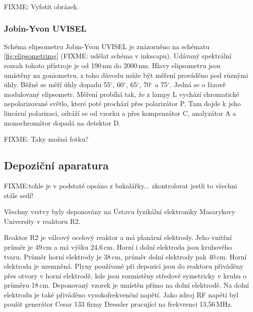 FIXME: Vyfotit obrázek.


\subsubsection{Jobin-Yvon UVISEL}
Schéma elipsometru Jobin-Yvon UVISEL je znázorněno na schématu \ref{fig:elipsometrimg} (FIXME: udělat schéma v inkscapu). Udávaný spektrální rozsah tohoto přístroje je od 190\,nm do 2000\,nm. Hlavy elipsometru jsou umístěny na goniometru, z toho důvodu může být měření prováděno pod různými úhly. Běžně se měří úhly dopadu 55$^\circ$, 60$^\circ$, 65$^\circ$, 70$^\circ$ a 75$^\circ$. Jedná se o fázově modulovaný elipsometr. Měření probíhá tak, že z lampy L vychází chromatické nepolarizované světlo, které poté prochází přes polarizátor P. Tam dojde k jeho lineární polarizaci, odráží se od vzorku a přes kompenzátor C, analyzátor A a monochromátor dopadá na detektor D.

FIXME: Taky možná fotku?


\subsection{Depoziční aparatura}
FIXME:tohle je v podstatě opsáno z bakalářky... zkontrolovat jestli to všechni stále sedí!

Všechny vrstvy byly deponovány na Ústavu fyzikální elektroniky Masarykovy University v reaktoru R2. 

Reaktor R2 je válcový ocelový reaktor a má planární elektrody. Jeho vnitřní průměr je 49\,cm a má výšku 24,6\,cm. Horní i dolní elektroda jsou kruhového tvaru. Průměr horní elektrody je 38\,cm, průměr dolní elektrody pak 40\,cm. Horní elektroda je uzemněná. Plyny používané při depozici jsou do reaktoru přiváděny přes otvory v horní elektrodě, kde jsou rozmístěny středově symetricky v kru\-hu o průměru 18\,cm. Deponovaný vzorek je umístěn přímo na dolní elektrodě. Na dolní elektrodu je také přiváděno vysokofrekvenční napětí. Jako zdroj RF napětí byl použit generátor Cesar 133 firmy Dressler pracující na frekvrenci 13,56\,MHz.

